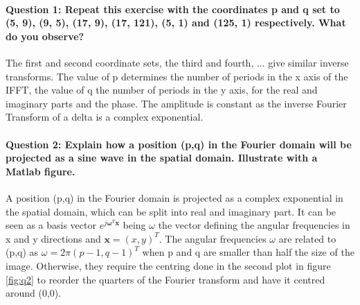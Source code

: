 \documentclass[12pt]{article}
\begin{document}
\maketitle



\paragraph{Question 1: 
Repeat this exercise with the coordinates p and q set to (5, 9), (9, 5), (17, 9),
(17, 121), (5, 1) and (125, 1) respectively. What do you observe?} 
The first and second coordinate sets, the third and fourth, ... give similar inverse transforms.  The value of p determines the number of periods in the x axis of the IFFT, the value of q the number of periods in the y axis, for the real and imaginary parts and the phase. The amplitude is constant as the inverse Fourier Transform of a delta is a complex exponential.

\paragraph{Question 2:
Explain how a position (p,q) in the Fourier domain will be projected as a sine wave in the spatial domain. Illustrate with a Matlab figure.}
A position (p,q) in the Fourier domain is projected as a complex exponential in the spatial domain, which can be split into real and imaginary part. It can be seen as a basis vector \(e^{j\mathbf{\omega}^T\mathbf{x}}\) being \(\omega\) the vector defining the angular frequencies in x and y directions and \(\mathbf{x}= (x,y)^T\). The angular frequencies \(\omega\) are related to (p,q) as \(\omega=2\pi(p-1,q-1)^T\) when p and q are smaller than half the size of the image. Otherwise, they require the centring done in the second plot in figure \ref{fig:q2} to reorder the quarters of the Fourier transform and have it centred around (0,0).
\end{document}
